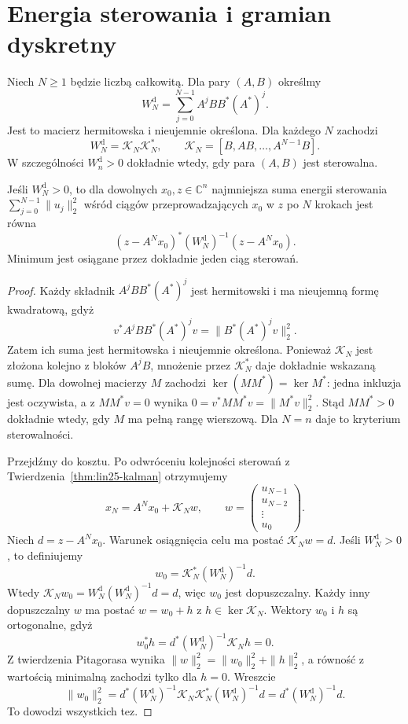 \section{Energia sterowania i gramian dyskretny}
\label{sec:lin25-discrete-gramian}

\begin{stwierdzenie}
\label{prop:lin25-discrete-gramian}
Niech \(N\ge1\) będzie
liczbą całkowitą.
Dla pary \((A,B)\)
określmy
\[
 W_N^{\mathrm d}=
 \sum_{j=0}^{N-1}A^jBB^*(A^*)^j.
\]
Jest to macierz hermitowska
i nieujemnie określona.
Dla każdego \(N\)
zachodzi
\[
 W_N^{\mathrm d}=
 \mathcal K_N\mathcal K_N^*,
 \qquad
 \mathcal K_N=[B,AB,\ldots,A^{N-1}B].
\]
W szczególności
\(W_n^{\mathrm d}>0\)
dokładnie wtedy, gdy
para \((A,B)\) jest sterowalna.

Jeśli \(W_N^{\mathrm d}>0\),
to dla dowolnych
\(x_0,z\in\mathbb C^n\)
najmniejsza suma energii sterowania
\(\sum_{j=0}^{N-1}\|u_j\|_2^2\)
wśród ciągów
przeprowadzających
\(x_0\) w \(z\)
po \(N\) krokach
jest równa
\[
 (z-A^Nx_0)^*
 (W_N^{\mathrm d})^{-1}
 (z-A^Nx_0).
\]
Minimum jest osiągane
przez dokładnie jeden
ciąg sterowań.
\end{stwierdzenie}
\begin{proof}
Każdy składnik
\(A^jBB^*(A^*)^j\)
jest hermitowski
i ma nieujemną formę
kwadratową, gdyż
\[
 v^*A^jBB^*(A^*)^jv
 =\|B^*(A^*)^jv\|_2^2.
\]
Zatem ich suma
jest hermitowska
i nieujemnie określona.
Ponieważ
\(\mathcal K_N\)
jest złożona kolejno
z bloków \(A^jB\),
mnożenie przez
\(\mathcal K_N^*\)
daje dokładnie wskazaną sumę.
Dla dowolnej macierzy \(M\)
zachodzi
\(\ker(MM^*)=\ker M^*\):
jedna inkluzja jest oczywista,
a z \(MM^*v=0\) wynika
\(0=v^*MM^*v=\|M^*v\|_2^2\).
Stąd \(MM^*>0\)
dokładnie wtedy, gdy
\(M\) ma pełną rangę wierszową.
Dla \(N=n\) daje to
kryterium sterowalności.

Przejdźmy do kosztu.
Po odwróceniu kolejności
sterowań z
Twierdzenia~\ref{thm:lin25-kalman}
otrzymujemy
\[
 x_N=A^Nx_0+\mathcal K_Nw,
 \qquad
 w=\begin{pmatrix}
      u_{N-1}\\u_{N-2}\\\vdots\\u_0
    \end{pmatrix}.
\]
Niech \(d=z-A^Nx_0\).
Warunek osiągnięcia celu
ma postać \(\mathcal K_Nw=d\).
Jeśli \(W_N^{\mathrm d}>0\),
to definiujemy
\[
 w_0=\mathcal K_N^*
          (W_N^{\mathrm d})^{-1}d.
\]
Wtedy
\(\mathcal K_Nw_0
 =W_N^{\mathrm d}
    (W_N^{\mathrm d})^{-1}d=d\),
więc \(w_0\) jest dopuszczalny.
Każdy inny dopuszczalny
\(w\) ma postać \(w=w_0+h\)
z \(h\in\ker\mathcal K_N\).
Wektory \(w_0\) i \(h\)
są ortogonalne, gdyż
\[
 w_0^*h
 =d^*(W_N^{\mathrm d})^{-1}
    \mathcal K_Nh=0.
\]
Z twierdzenia Pitagorasa
wynika
\(\|w\|_2^2
 =\|w_0\|_2^2+\|h\|_2^2\),
a równość z wartością
minimalną zachodzi
tylko dla \(h=0\).
Wreszcie
\[
 \|w_0\|_2^2
 =d^*(W_N^{\mathrm d})^{-1}
    \mathcal K_N\mathcal K_N^*
    (W_N^{\mathrm d})^{-1}d
 =d^*(W_N^{\mathrm d})^{-1}d.
\]
To dowodzi wszystkich tez.
\end{proof}


